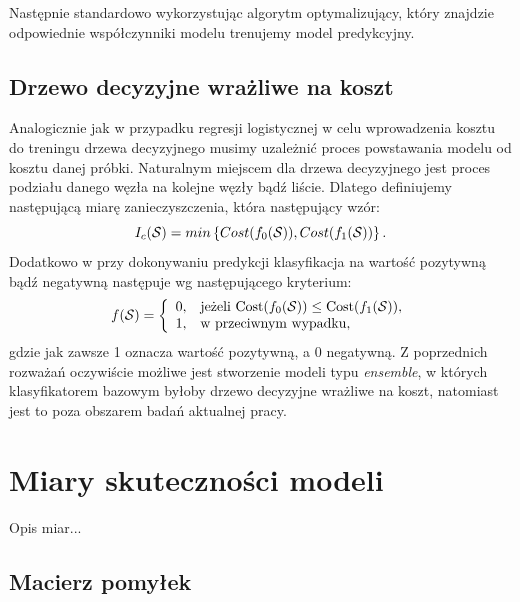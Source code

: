 \documentclass[openany]{book}
\begin{document}
		Następnie standardowo wykorzystując algorytm optymalizujący, który znajdzie odpowiednie współczynniki modelu trenujemy model predykcyjny.
\subsection{Drzewo decyzyjne wrażliwe na koszt}
	Analogicznie jak w przypadku regresji logistycznej w celu wprowadzenia kosztu do treningu drzewa decyzyjnego musimy uzależnić proces powstawania modelu od kosztu danej próbki. Naturalnym miejscem dla drzewa decyzyjnego jest proces podziału danego węzła na kolejne węzły bądź liście. Dlatego definiujemy następującą miarę zanieczyszczenia, która następujący wzór:
	$$ I_c(\mathcal{S}) = min \left\{ Cost(f_0(\mathcal{S})), Cost(f_1(\mathcal{S})) \right\} \text{.}$$
	Dodatkowo w przy dokonywaniu predykcji klasyfikacja na wartość pozytywną bądź negatywną następuje wg następującego kryterium:
	$$ f(\mathcal{S}) =  \left\{
		\begin{array}{rl}
			0, &\mbox{jeżeli $\text{Cost}(f_0(\mathcal{S})) \leq \text{Cost}(f_1(\mathcal{S}))$}, \\
			1, &\mbox{w przeciwnym wypadku},
		\end{array}{}
	\right.
	$$
	gdzie jak zawsze 1 oznacza wartość pozytywną, a 0 negatywną. 
	Z poprzednich rozważań oczywiście możliwe jest stworzenie modeli typu \textit{ensemble}, w których klasyfikatorem bazowym byłoby drzewo decyzyjne wrażliwe na koszt, natomiast jest to poza obszarem badań aktualnej pracy.
	
\section{Miary skuteczności modeli}
	
	Opis miar...
	
	\subsection{Macierz pomyłek}
	
\end{document}

